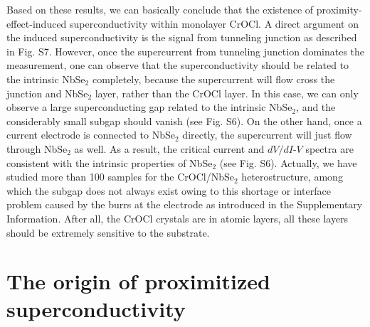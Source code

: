 \documentclass[%
 reprint,
superscriptaddress,
 amsmath,amssymb,
 aps,
]{revtex4-2}
\begin{document}
Based on these results, we can basically conclude that the existence of proximity-effect-induced superconductivity within monolayer CrOCl. A direct argument on the induced superconductivity is the signal from tunneling junction as described in Fig. S7. However, once the supercurrent from tunneling junction dominates the measurement, one can observe that the superconductivity should be related to the intrinsic NbSe$_2$ completely, because the supercurrent will flow cross the junction and NbSe$_2$ layer, rather than the CrOCl layer. In this case, we can only observe a large superconducting gap related to the intrinsic NbSe$_2$, and the considerably small subgap should vanish (see Fig. S6). On the other hand, once a current electrode is connected to NbSe$_2$ directly, the supercurrent will just flow through NbSe$_2$ as well. As a result, the critical current and $dV/dI$-$V$ spectra are consistent with the intrinsic properties of NbSe$_2$ (see Fig. S6). Actually, we have studied more than 100 samples for the CrOCl/NbSe$_2$ heterostructure, among which the subgap does not always exist owing to this shortage or interface problem caused by the burrs at the electrode as introduced in the Supplementary Information. After all, the CrOCl crystals are in atomic layers, all these layers should be extremely sensitive to the substrate.

\section{The origin of proximitized superconductivity}
\end{document}
